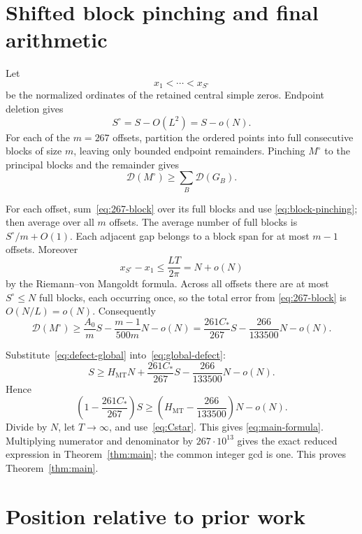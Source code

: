 \documentclass[11pt]{article}
\newcommand{\cD}{\mathcal D}
\newcommand{\MT}{\mathrm{MT}}
\begin{document}
\section{Shifted block pinching and final arithmetic}\label{sec:pinching}

Let
\[
 x_1<\cdots<x_{S^\circ}
\]
be the normalized ordinates of the retained central simple zeros.  Endpoint
deletion gives
\begin{equation}\label{eq:S-central}
 S^\circ=S-O(L^2)=S-o(N).
\end{equation}
For each of the $m=267$ offsets, partition the ordered points into full
consecutive blocks of size $m$, leaving only bounded endpoint remainders.
Pinching $M^\circ$ to the principal blocks and the remainder gives
\begin{equation}\label{eq:block-pinching}
 \cD(M^\circ)\ge\sum_B\cD(G_B).
\end{equation}

For each offset, sum~\eqref{eq:267-block} over its full blocks and use
\eqref{eq:block-pinching}; then average over all $m$ offsets.  The average
number of full blocks is $S^\circ/m+O(1)$.  Each adjacent gap belongs to a
block span for at most $m-1$ offsets.  Moreover
\begin{equation}\label{eq:total-span}
 x_{S^\circ}-x_1
 \le\frac{LT}{2\pi}=N+o(N)
\end{equation}
by the Riemann--von Mangoldt formula.  Across all offsets there are at most
$S^\circ\le N$ full blocks, each occurring once, so the total error from
\eqref{eq:267-block} is $O(N/L)=o(N)$.  Consequently
\begin{equation}\label{eq:defect-global}
 \cD(M^\circ)
 \ge\frac{A_0}{m}S-\frac{m-1}{500m}N-o(N)
 =\frac{261C_*}{267}S-\frac{266}{133500}N-o(N).
\end{equation}

Substitute~\eqref{eq:defect-global} into~\eqref{eq:global-defect}:
\[
 S\ge H_{\MT}N+\frac{261C_*}{267}S
 -\frac{266}{133500}N-o(N).
\]
Hence
\begin{equation}\label{eq:solve}
 \left(1-\frac{261C_*}{267}\right)S
 \ge\left(H_{\MT}-\frac{266}{133500}\right)N-o(N).
\end{equation}
Divide by $N$, let $T\to\infty$, and use~\eqref{eq:Cstar}.  This gives
\eqref{eq:main-formula}.  Multiplying numerator and denominator by
$267\cdot10^{13}$ gives the exact reduced expression in
Theorem~\ref{thm:main}; the common integer gcd is one.  This proves
Theorem~\ref{thm:main}.

\section{Position relative to prior work}\label{sec:prior}
\end{document}
